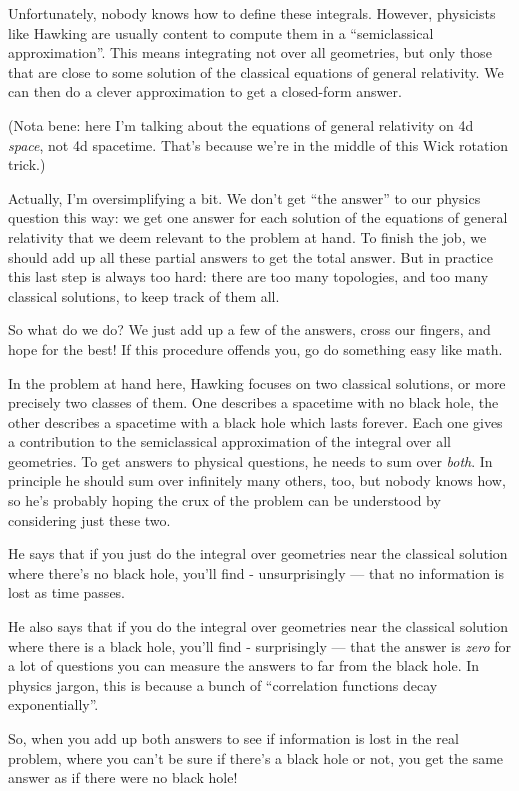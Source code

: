 \documentclass{article}
\begin{document}
Unfortunately, nobody knows how to define these integrals. However,
physicists like Hawking are usually content to compute them in a
``semiclassical approximation''. This means integrating not over all
geometries, but only those that are close to some solution of the
classical equations of general relativity. We can then do a clever
approximation to get a closed-form answer.

(Nota bene: here I'm talking about the equations of general relativity
on 4d \emph{space}, not 4d spacetime. That's because we're in the middle
of this Wick rotation trick.)

Actually, I'm oversimplifying a bit. We don't get ``the answer'' to our
physics question this way: we get one answer for each solution of the
equations of general relativity that we deem relevant to the problem at
hand. To finish the job, we should add up all these partial answers to
get the total answer. But in practice this last step is always too hard:
there are too many topologies, and too many classical solutions, to keep
track of them all.

So what do we do? We just add up a few of the answers, cross our
fingers, and hope for the best! If this procedure offends you, go do
something easy like math.

In the problem at hand here, Hawking focuses on two classical solutions,
or more precisely two classes of them. One describes a spacetime with no
black hole, the other describes a spacetime with a black hole which
lasts forever. Each one gives a contribution to the semiclassical
approximation of the integral over all geometries. To get answers to
physical questions, he needs to sum over \emph{both}. In principle he
should sum over infinitely many others, too, but nobody knows how, so
he's probably hoping the crux of the problem can be understood by
considering just these two.

He says that if you just do the integral over geometries near the
classical solution where there's no black hole, you'll find -
unsurprisingly --- that no information is lost as time passes.

He also says that if you do the integral over geometries near the
classical solution where there is a black hole, you'll find -
surprisingly --- that the answer is \emph{zero} for a lot of questions
you can measure the answers to far from the black hole. In physics
jargon, this is because a bunch of ``correlation functions decay
exponentially''.

So, when you add up both answers to see if information is lost in the
real problem, where you can't be sure if there's a black hole or not,
you get the same answer as if there were no black hole!
\end{document}
